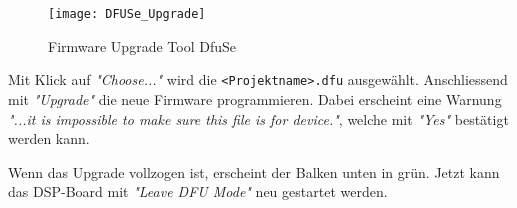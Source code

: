 \begin{figure}[H]
	\centering
	\texttt{[image: DFUSe\_Upgrade]}
	\caption{Firmware Upgrade Tool DfuSe}
	\label{pic:DFUSe_Upgrade}
\end{figure}

Mit Klick auf \textit{"Choose..."} wird die \texttt{<Projektname>.dfu} ausgewählt.
Anschliessend mit \textit{"Upgrade"} die neue Firmware programmieren.
Dabei erscheint eine Warnung \textit{"...it is impossible to make sure this file is for device."}, welche mit \textit{"Yes"} bestätigt werden kann.

Wenn das Upgrade vollzogen ist, erscheint der Balken unten in grün. Jetzt kann das DSP-Board mit \textit{"Leave DFU Mode"} neu gestartet werden.


